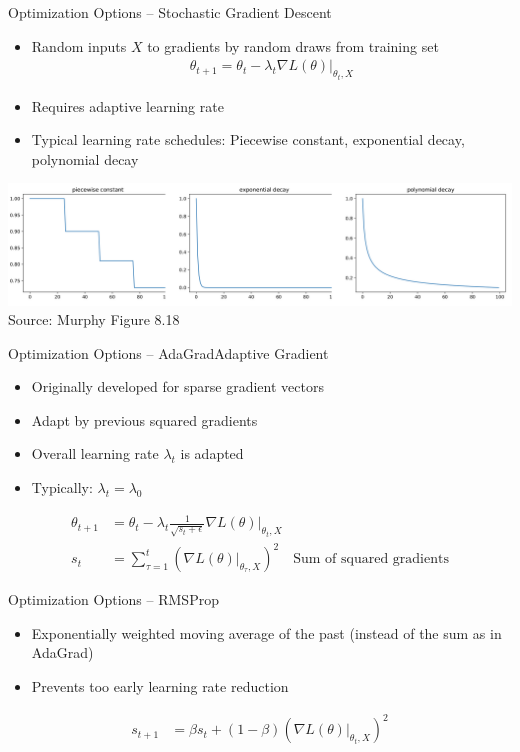 \documentclass[ignorenonframetext,xcolor=x11names]{beamer}
\begin{document}
\begin{frame}{Optimization Options -- Stochastic Gradient Descent}
\begin{itemize}
   \item Random inputs $X$ to gradients by random draws from training set
\begin{align*}
\theta_{t+1} = \theta_t - \lambda_t \nabla L(\theta) \rvert_{\theta_t, X}
\end{align*}
\vspace{-\baselineskip}
   \item Requires adaptive learning rate
   \item Typical learning rate schedules: Piecewise constant, exponential decay, polynomial decay
\end{itemize}
\includegraphics[width=\textwidth]{screen5.png} \\

\scriptsize Source: Murphy Figure 8.18
\end{frame}


\begin{frame}{Optimization Options -- AdaGrad}{Adaptive Gradient}
\begin{itemize}
  \item Originally developed for sparse gradient vectors
  \item Adapt by previous squared gradients
  \item Overall learning rate $\lambda_t$ is adapted
  \item Typically: $\lambda_t = \lambda_0$
\end{itemize}
\begin{align*}
\theta_{t+1} &= \theta_t - \lambda_t \frac{1}{\sqrt{s_t + \epsilon}}\nabla L(\theta) \rvert_{\theta_t, X} \\
s_t &= \sum_{\tau=1}^t \left( \nabla L(\theta)\rvert_{\theta_\tau, X}\right)^2 \quad \text{Sum of squared gradients}
\end{align*}
\end{frame}

\begin{frame}{Optimization Options -- RMSProp}
\begin{itemize}
   \item Exponentially weighted moving average of the past (instead of the sum as in AdaGrad)
   \item Prevents too early learning rate reduction
\end{itemize}
\begin{align*}
s_{t+1} &= \beta s_t + (1-\beta) \left( \nabla L(\theta)\rvert_{\theta_t, X}\right)^2 
\end{align*}
\end{frame}
\end{document}
